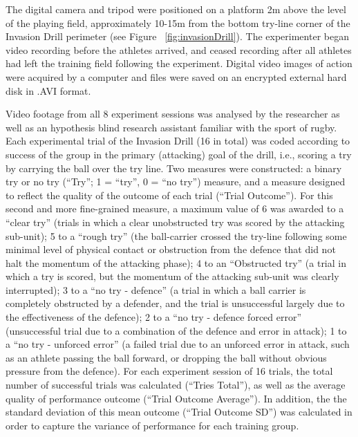 The digital camera and tripod were positioned on a platform 2m above the level of the playing field, approximately 10-15m from the bottom try-line corner of the Invasion Drill perimeter (see Figure ~\ref{fig:invasionDrill}). The experimenter began video recording before the athletes arrived, and ceased recording after all athletes had left the training field following the experiment. Digital video images of action were acquired by a computer and files were saved on an encrypted external hard disk in .AVI format.


Video footage from all 8 experiment sessions was analysed by the researcher as well as an hypothesis blind research assistant familiar with the sport of rugby.  Each experimental trial of the Invasion Drill (16 in total) was coded according to success of the group in the primary (attacking) goal of the drill, i.e., scoring a try by carrying the ball over the try line.  Two measures were constructed: a binary try or no try (``Try''; 1 = ``try'', 0 = ``no try'') measure, and a measure designed to reflect the quality of the outcome of each trial (``Trial Outcome''). For this second and more fine-grained measure, a maximum value of 6 was awarded to a ``clear try'' (trials in which a clear unobstructed try was scored by the attacking sub-unit); 5 to a ``rough try'' (the ball-carrier crossed the try-line following some minimal level of physical contact or obstruction from the defence that did not halt the momentum of the attacking phase); 4 to an ``Obstructed try'' (a trial in which a try is scored, but the momentum of the attacking sub-unit was clearly interrupted); 3 to a ``no try - defence'' (a trial in which a ball carrier is completely obstructed by a defender, and the trial is unsuccessful largely due to the effectiveness of the defence); 2 to a ``no try - defence forced error'' (unsuccessful trial due to a combination of the defence and error in attack); 1 to a ``no try - unforced error'' (a failed trial due to an unforced error in attack, such as an athlete passing the ball forward, or dropping the ball without obvious pressure from the defence).  For each experiment session of 16 trials, the total number of successful trials was calculated (``Tries Total''), as well as the average quality of performance outcome (``Trial Outcome Average'').  In addition, the the standard deviation of this mean outcome (``Trial Outcome SD'') was calculated in order to capture the variance of performance for each training group.

